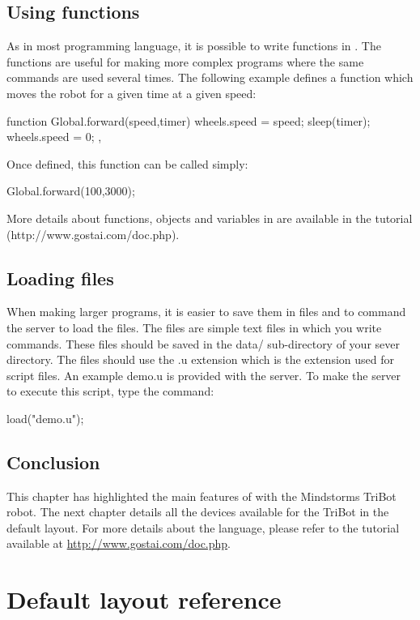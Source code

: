\subsection{Using functions}
As in most programming language, it is possible to write functions in \urbi. The
functions are useful for making more complex programs where the same commands
are used several times.
The following example defines a function which moves the robot for a given time
at a given speed:
\begin{urbiunchecked}
  function Global.forward(speed,timer)
  {
    wheels.speed = speed;
    sleep(timer);
    wheels.speed = 0;
  },
\end{urbiunchecked}


Once defined, this function can be called simply:
\begin{urbiunchecked}
  Global.forward(100,3000);
\end{urbiunchecked}

More details about functions, objects and variables in \urbi are available in
the \urbi tutorial (http://www.gostai.com/doc.php).

\subsection{Loading files}
When making larger \urbi programs, it is easier to save them in files and to
command the server to load the files.
The files are simple text files in which you write \urbi commands. These files
should be saved in the data/ sub-directory of your sever directory. The files
should use the .u extension which is the extension used for \urbi script files.
An example demo.u is provided with the server. To make the \urbi server to
execute this script, type the \urbi command:
\begin{urbiunchecked}
  load("demo.u");
\end{urbiunchecked}


\subsection{Conclusion}
This chapter has highlighted the main features of \urbi with the Mindstorms
TriBot robot. The next chapter details all the devices available for the
TriBot in the default layout. For more details about the \urbi language,
please refer to the \urbi tutorial available at
\url{http://www.gostai.com/doc.php}.


\section{Default layout reference}

